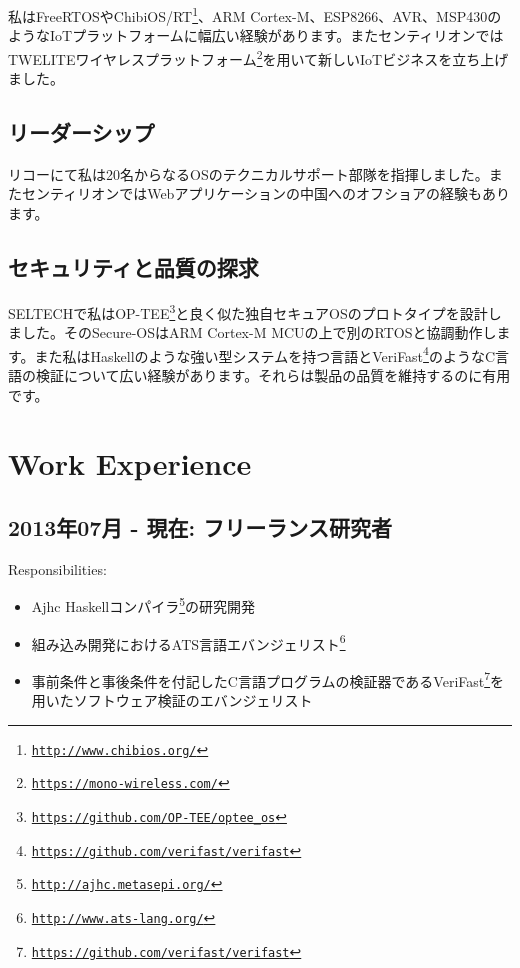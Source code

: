 \documentclass[letterpaper]{article}
\begin{document}
私はFreeRTOSやChibiOS/RT\footnote{\href{http://www.chibios.org/}{\tt http://www.chibios.org/}}、ARM Cortex-M、ESP8266、AVR、MSP430のようなIoTプラットフォームに幅広い経験があります。またセンティリオンではTWELITEワイヤレスプラットフォーム\footnote{\href{https://mono-wireless.com/}{\tt https://mono-wireless.com/}}を用いて新しいIoTビジネスを立ち上げました。

\subsection*{リーダーシップ}

リコーにて私は20名からなるOSのテクニカルサポート部隊を指揮しました。またセンティリオンではWebアプリケーションの中国へのオフショアの経験もあります。

\subsection*{セキュリティと品質の探求}

SELTECHで私はOP-TEE\footnote{\href{https://github.com/OP-TEE/optee\_os}{\tt https://github.com/OP-TEE/optee\_os}}と良く似た独自セキュアOSのプロトタイプを設計しました。そのSecure-OSはARM Cortex-M MCUの上で別のRTOSと協調動作します。また私はHaskellのような強い型システムを持つ言語とVeriFast\footnote{\href{https://github.com/verifast/verifast}{\tt https://github.com/verifast/verifast}}のようなC言語の検証について広い経験があります。それらは製品の品質を維持するのに有用です。

\newpage

\section*{Work Experience}

\subsection*{2013年07月 - 現在: フリーランス研究者}

Responsibilities:

\begin{itemize}
  \item Ajhc Haskellコンパイラ\footnote{\href{http://ajhc.metasepi.org/}{\tt http://ajhc.metasepi.org/}}の研究開発
  \item 組み込み開発におけるATS言語エバンジェリスト\footnote{\href{http://www.ats-lang.org/}{\tt http://www.ats-lang.org/}}
  \item 事前条件と事後条件を付記したC言語プログラムの検証器であるVeriFast\footnote{\href{https://github.com/verifast/verifast}{\tt https://github.com/verifast/verifast}}を用いたソフトウェア検証のエバンジェリスト
\end{itemize}
\end{document}
